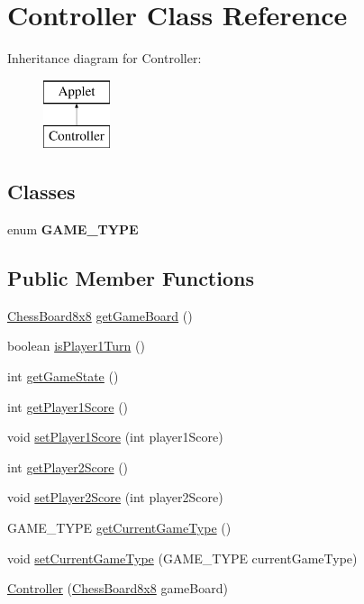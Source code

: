 \hypertarget{class_controller}{}\section{Controller Class Reference}
\label{class_controller}
Inheritance diagram for Controller\+:\begin{figure}[H]
\begin{center}
\leavevmode
\includegraphics[height=2.000000cm]{class_controller}
\end{center}
\end{figure}
\subsection*{Classes}
\begin{DoxyCompactItemize}
\item 
enum {\bfseries G\+A\+M\+E\+\_\+\+T\+Y\+PE}
\end{DoxyCompactItemize}
\subsection*{Public Member Functions}
\begin{DoxyCompactItemize}
\item 
\mbox{\hyperlink{class_chess_board8x8}{Chess\+Board8x8}} \mbox{\hyperlink{class_controller_a15e2c59414bfb52f5ba9b673fb4b93c2}{get\+Game\+Board}} ()
\item 
boolean \mbox{\hyperlink{class_controller_a205f52396194c605eeee2db013d4cc1b}{is\+Player1\+Turn}} ()
\item 
int \mbox{\hyperlink{class_controller_a27007d92148bf1197f4a3f0c11664505}{get\+Game\+State}} ()
\item 
int \mbox{\hyperlink{class_controller_a2805b206f72e1c9c783c8077231180b1}{get\+Player1\+Score}} ()
\item 
void \mbox{\hyperlink{class_controller_a4c83cbb9d5736813988acb340ccd709f}{set\+Player1\+Score}} (int player1\+Score)
\item 
int \mbox{\hyperlink{class_controller_af537df2be96eb58fbd5c6866e7b0e32f}{get\+Player2\+Score}} ()
\item 
void \mbox{\hyperlink{class_controller_a3b3ac4a3190e42a00a11996b88a89989}{set\+Player2\+Score}} (int player2\+Score)
\item 
G\+A\+M\+E\+\_\+\+T\+Y\+PE \mbox{\hyperlink{class_controller_a47ff273223f53707d8c5a8f151b7f03b}{get\+Current\+Game\+Type}} ()
\item 
void \mbox{\hyperlink{class_controller_aa308ff964753afb8fb1f8b9c753dc214}{set\+Current\+Game\+Type}} (G\+A\+M\+E\+\_\+\+T\+Y\+PE current\+Game\+Type)
\item 
\mbox{\hyperlink{class_controller_a5f680484b02e9b5009af214730425710}{Controller}} (\mbox{\hyperlink{class_chess_board8x8}{Chess\+Board8x8}} game\+Board)
\end{DoxyCompactItemize}
